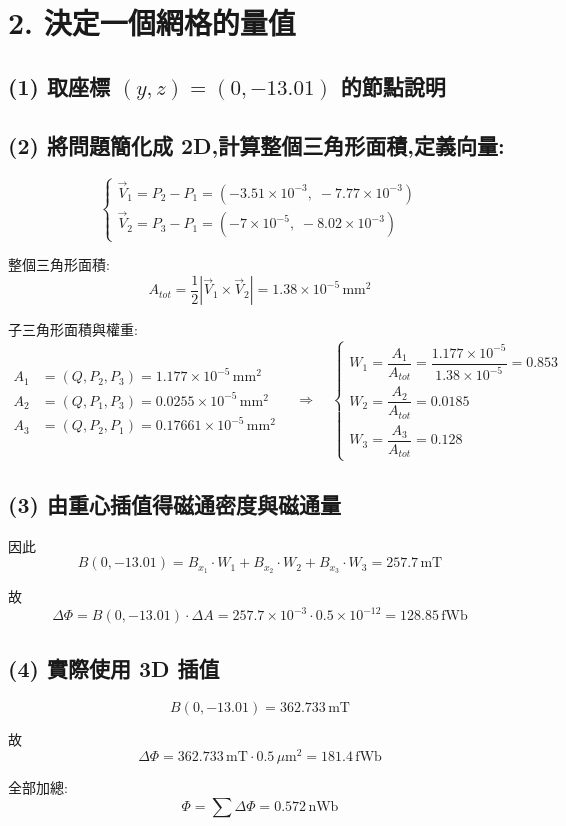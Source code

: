 \documentclass[12pt,a4paper]{article}
\begin{document}
\section*{2. 決定一個網格的量值}

\subsection*{(1) 取座標 $(y, z) = (0, -13.01)$ 的節點說明}

\subsection*{(2) 將問題簡化成 2D,計算整個三角形面積,定義向量:}

\[
\begin{cases}
\vec{V}_1 = P_2 - P_1 = (-3.51 \times 10^{-3},\; -7.77 \times 10^{-3}) \\[4pt]
\vec{V}_2 = P_3 - P_1 = (-7 \times 10^{-5},\; -8.02 \times 10^{-3})
\end{cases}
\]

整個三角形面積:
\[
A_{tot} = \frac{1}{2}\left|\vec{V}_1 \times \vec{V}_2\right| = 1.38 \times 10^{-5}\,\mathrm{mm}^2
\]

子三角形面積與權重:
\[
\begin{aligned}
A_1 &= (Q, P_2, P_3) = 1.177 \times 10^{-5}\,\mathrm{mm}^2 \\
A_2 &= (Q, P_1, P_3) = 0.0255 \times 10^{-5}\,\mathrm{mm}^2 \\
A_3 &= (Q, P_2, P_1) = 0.17661 \times 10^{-5}\,\mathrm{mm}^2
\end{aligned}
\quad\Rightarrow\quad
\begin{cases}
W_1 = \dfrac{A_1}{A_{tot}} = \dfrac{1.177 \times 10^{-5}}{1.38 \times 10^{-5}} = 0.853 \\[8pt]
W_2 = \dfrac{A_2}{A_{tot}} = 0.0185 \\[8pt]
W_3 = \dfrac{A_3}{A_{tot}} = 0.128
\end{cases}
\]

\subsection*{(3) 由重心插值得磁通密度與磁通量}

因此
\[
B(0, -13.01) = B_{x_1} \cdot W_1 + B_{x_2} \cdot W_2 + B_{x_3} \cdot W_3 = 257.7\,\mathrm{mT}
\]

故
\[
\Delta \Phi = B(0, -13.01) \cdot \Delta A = 257.7 \times 10^{-3} \cdot 0.5 \times 10^{-12} = 128.85\,\mathrm{fWb}
\]

\subsection*{(4) 實際使用 3D 插值}

\[
B(0, -13.01) = 362.733\,\mathrm{mT}
\]

故
\[
\Delta \Phi = 362.733\,\mathrm{mT} \cdot 0.5\,\mu\mathrm{m}^2 = 181.4\,\mathrm{fWb}
\]

全部加總:
\[
\boxed{\;\Phi = \sum \Delta \Phi = 0.572\,\mathrm{nWb}\;}
\]
\end{document}
